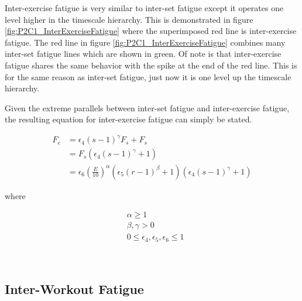 Inter-exercise fatigue is very similar to inter-set fatigue except  it operates one level higher in the timescale hierarchy. This is demonstrated in figure \ref{fig:P2C1_InterExerciseFatigue} where the superimposed red line is inter-exercise fatigue. The red line in figure \ref{fig:P2C1_InterExerciseFatigue} combines many inter-set fatigue lines which are shown in green. Of note is that inter-exercise fatigue shares the same behavior with the spike at the end of the red line. This is for the same reason as inter-set fatigue, just now it is one level up the timescale hierarchy.

Given the extreme parallels between inter-set fatigue and inter-exercise fatigue, the resulting equation for inter-exercise fatigue can simply be stated.

\begin{minipage}{\textwidth}
	\begin{equation}
		\label{eq:P2C1_InterExerciseFatigue}
		\begin{split}
			F_e & = \epsilon_4 (s-1) ^ \gamma F_s + F_s \\
				& = F_s\left( \epsilon_4 (s-1)^\gamma+1  \right) \\
				& = 	\epsilon_6 \left( \frac{E}{10} \right)^\alpha
					\left( \epsilon_5 (r-1)^\beta + 1 \right)
					\left(\epsilon_4 (s-1)^\gamma+1  \right)
		\end{split}
	\end{equation}
	\centerline{where}
	\begin{equation*}
		\begin{split}
		    & \alpha \ge 1 \\
		    & \beta,\gamma > 0 \\
			& 0 \le \epsilon_4, \epsilon_5, \epsilon_6 \le 1
		\end{split}
	\end{equation*}
\end{minipage}\\


\subsection{Inter-Workout Fatigue}
\label{sec:P2C1_InterWorkoutFatigue}

